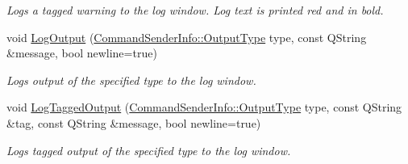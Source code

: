 \begin{DoxyCompactItemize}
\begin{DoxyCompactList}\small\item\em Logs a tagged warning to the log window. Log text is printed red and in bold. \end{DoxyCompactList}\item 
void \hyperlink{group___global_variables_gab9e5c16962c3cdcd7220de6dfa5a70b5}{Log\-Output} (\hyperlink{class_command_sender_info_a3a5e6a2ef1772f6557f351652c2e3b60}{Command\-Sender\-Info\-::\-Output\-Type} type, const Q\-String \&message, bool newline=true)
\begin{DoxyCompactList}\small\item\em Logs output of the specified type to the log window. \end{DoxyCompactList}\item 
void \hyperlink{group___global_variables_ga63348a368c397865f05d9a17c94752c6}{Log\-Tagged\-Output} (\hyperlink{class_command_sender_info_a3a5e6a2ef1772f6557f351652c2e3b60}{Command\-Sender\-Info\-::\-Output\-Type} type, const Q\-String \&tag, const Q\-String \&message, bool newline=true)
\begin{DoxyCompactList}\small\item\em Logs tagged output of the specified type to the log window. \end{DoxyCompactList}\end{DoxyCompactItemize}

